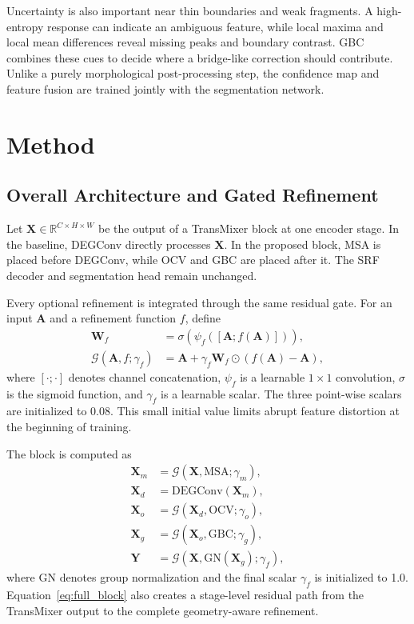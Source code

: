 \documentclass[preprint,12pt]{elsarticle}
\newcommand{\R}{\mathbb{R}}
\begin{document}
Uncertainty is also important near thin boundaries and weak fragments. A high-entropy response can indicate an ambiguous feature, while local maxima and local mean differences reveal missing peaks and boundary contrast. GBC combines these cues to decide where a bridge-like correction should contribute. Unlike a purely morphological post-processing step, the confidence map and feature fusion are trained jointly with the segmentation network.

\section{Method}
\label{sec:method}

\subsection{Overall Architecture and Gated Refinement}

Let $\mathbf{X}\in\R^{C\times H\times W}$ be the output of a TransMixer block at one encoder stage. In the baseline, DEGConv directly processes $\mathbf{X}$. In the proposed block, MSA is placed before DEGConv, while OCV and GBC are placed after it. The SRF decoder and segmentation head remain unchanged.

Every optional refinement is integrated through the same residual gate. For an input $\mathbf{A}$ and a refinement function $f$, define
\begin{align}
\mathbf{W}_f &= \sigma\!\left(\psi_f([\mathbf{A};f(\mathbf{A})])\right), \\
\mathcal{G}(\mathbf{A},f;\gamma_f) &=
\mathbf{A}+\gamma_f\mathbf{W}_f\odot\left(f(\mathbf{A})-\mathbf{A}\right),
\label{eq:residual_gate}
\end{align}
where $[\cdot;\cdot]$ denotes channel concatenation, $\psi_f$ is a learnable $1\times1$ convolution, $\sigma$ is the sigmoid function, and $\gamma_f$ is a learnable scalar. The three point-wise scalars are initialized to 0.08. This small initial value limits abrupt feature distortion at the beginning of training.

The block is computed as
\begin{align}
\mathbf{X}_{m} &= \mathcal{G}(\mathbf{X},\mathrm{MSA};\gamma_m), \\
\mathbf{X}_{d} &= \mathrm{DEGConv}(\mathbf{X}_{m}), \\
\mathbf{X}_{o} &= \mathcal{G}(\mathbf{X}_{d},\mathrm{OCV};\gamma_o), \\
\mathbf{X}_{g} &= \mathcal{G}(\mathbf{X}_{o},\mathrm{GBC};\gamma_g), \\
\mathbf{Y} &= \mathcal{G}(\mathbf{X},\mathrm{GN}(\mathbf{X}_{g});\gamma_f),
\label{eq:full_block}
\end{align}
where GN denotes group normalization and the final scalar $\gamma_f$ is initialized to 1.0. Equation~\eqref{eq:full_block} also creates a stage-level residual path from the TransMixer output to the complete geometry-aware refinement.
\end{document}
